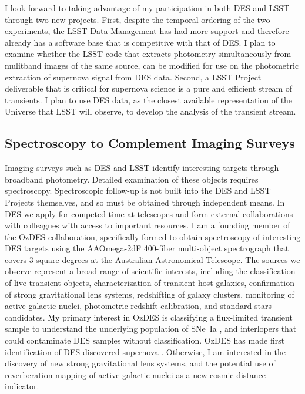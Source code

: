\documentclass{article}
\begin{document}
I look forward to taking advantage of my participation in both DES and LSST through two new projects.
First, despite the temporal ordering of the two experiments, the LSST Data Management has had more support and therefore
already has a software base that is competitive with that of DES.  I plan to examine whether the LSST code that extracts photometry simultaneously from mulitband images
of the same source, can be modified for use on the photometric extraction of supernova signal from DES data.
Second, a LSST Project deliverable that is critical for supernova science is a pure and efficient stream of transients.
I plan to use
DES data, as the closest available representation of the Universe that LSST will observe, to develop the 
analysis of the transient stream.


\subsection{Spectroscopy to Complement Imaging Surveys}
Imaging surveys such as DES and LSST identify interesting targets through broadband photometry.
Detailed examination of these objects requires spectroscopy. Spectroscopic follow-up is not
built into the DES and LSST Projects themselves, and so must be obtained through independent means.
In DES we apply for competed time at
telescopes and form external collaborations with colleagues with access to important resources.  I am a founding member of the OzDES collaboration, specifically formed to obtain spectroscopy
of interesting DES targets using the AAOmega-2dF 400-fiber multi-object spectrograph that covers
3 square degrees at the Australian Astronomical Telescope.
The sources we observe represent a broad range of scientific interests,
including the classification of live transient objects, characterization of transient host galaxies, confirmation
of strong gravitational lens systems, redshifting of galaxy clusters, monitoring of active galactic nuclei, photometric-redshift
calibration,
and
standard stars candidates.  My primary interest in OzDES is classifying a flux-limited transient sample to understand the
underlying population of SNe~Ia  \cite{2006MNRAS.370..933J}, and interlopers that could contaminate DES samples
without classification.  OzDES has made first identification of DES-discovered supernova \cite{2013ATel.5568....1C}.
Otherwise, I am interested in the discovery of new strong gravitational lens systems, and the potential use
of reverberation mapping of active galactic nuclei as a new cosmic distance indicator.
\end{document}
